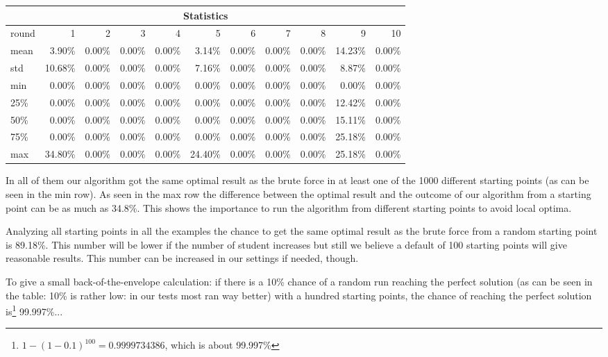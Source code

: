 \begin{center}
    \begin{tabular}{|l|r|r|r|r|r|r|r|r|r|r|}
        \hline
        \multicolumn{11}{|c|}{Statistics} \\
        \hline
         round	& 1 		& 2 	  & 3 	    & 4 	 & 5	   & 6 	    & 7 	 & 8 	  & 9 		& 10 	 \\
        \hline
         mean 	& 3.90\%	& 0.00\%  & 0.00\%  & 0.00\% & 3.14\%  & 0.00\% & 0.00\% & 0.00\% & 14.23\% & 0.00\% \\
         std 	& 10.68\%	& 0.00\%  & 0.00\%  & 0.00\% & 7.16\%  & 0.00\% & 0.00\% & 0.00\% & 8.87\%  & 0.00\% \\
         min 	& 0.00\%	& 0.00\%  & 0.00\%  & 0.00\% & 0.00\%  & 0.00\% & 0.00\% & 0.00\% & 0.00\%  & 0.00\% \\
         25\% 	& 0.00\%	& 0.00\%  & 0.00\%  & 0.00\% & 0.00\%  & 0.00\% & 0.00\% & 0.00\% & 12.42\% & 0.00\% \\
         50\%	& 0.00\%	& 0.00\%  & 0.00\%  & 0.00\% & 0.00\%  & 0.00\% & 0.00\% & 0.00\% & 15.11\% & 0.00\% \\
         75\%	& 0.00\%	& 0.00\%  & 0.00\%  & 0.00\% & 0.00\%  & 0.00\% & 0.00\% & 0.00\% & 25.18\% & 0.00\% \\
         max 	& 34.80\%	& 0.00\%  & 0.00\%  & 0.00\% & 24.40\% & 0.00\% & 0.00\% & 0.00\% & 25.18\% & 0.00\% \\
         \hline
    \end{tabular}
\end{center}

In all of them our algorithm got the same optimal result as the brute force in at least one of the 1000 different starting points (as can be seen in the min row). As seen in the max row the difference between the optimal result and the outcome of our algorithm from a starting point can be as much as 34.8\%. This shows the importance to run the algorithm from different starting points to avoid local optima.

Analyzing all starting points in all the examples the chance to get the same optimal result as the brute force from a random starting point is 89.18\%. This number will be lower if the number of student increases but still we believe a default of 100 starting points will give reasonable results. This number can be increased in our settings if needed, though.

To give a small back-of-the-envelope calculation: if there is a 10\% chance of a random run reaching the perfect solution (as can be seen in the table: 10\% is rather low: in our tests most ran way better) with a hundred starting points, the chance of reaching the perfect solution is\footnote{$1-(1-0.1)^{100}=0.9999734386$, which is about 99.997\%} 99.997\%...

